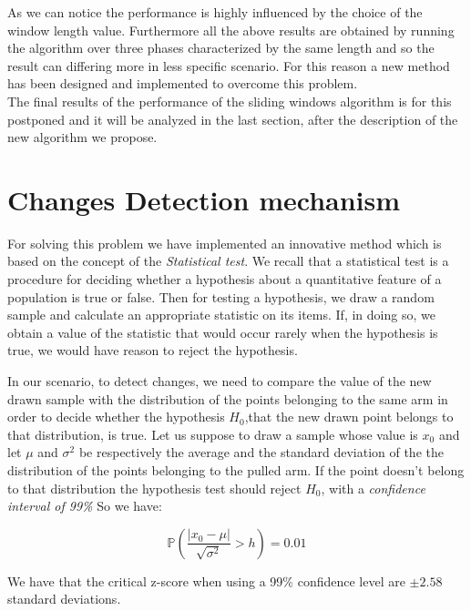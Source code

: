 As we can notice the performance is highly influenced by the choice of the window length value.
Furthermore all the above results are obtained by running the algorithm over three phases characterized by the same length and so the result can differing more in less specific scenario. For this reason a new method has been designed and implemented to overcome this problem.\\
The final results of the performance of the sliding windows algorithm is for this postponed and it will be analyzed in the last section, after the description of the new algorithm we propose.


\section{Changes Detection mechanism}

For solving this problem we have implemented an innovative method which is based on the concept of the \textit{Statistical test}.
We recall that a statistical test is a procedure for deciding whether a hypothesis about a quantitative feature of a population is true or false. Then for testing a hypothesis, we draw a random sample and calculate an appropriate statistic on its items. If, in doing so, we obtain a value of the statistic that would occur rarely when the hypothesis is true, we would have reason to reject the hypothesis.

In our scenario, to detect changes, we need to compare the value of the new drawn sample with the distribution of the points belonging to the same arm in order to decide whether the hypothesis $H_0$,that the new drawn point belongs to that distribution, is true.
Let us suppose to draw a sample whose value is $x_0$ and let $\mu$ and $\sigma^2$ be respectively the average
and the standard deviation of the the distribution of the points belonging to the pulled arm.
If the point doesn't belong to that distribution the hypothesis test should reject $H_0$, with a \textit{confidence interval of 99\%} So we have:

\begin{equation}
    \mathbb{P}\left(\frac{|x_0 - \mu|}{\sqrt{\sigma^2}} > h \right) = 0.01
\end{equation}

We have that the critical z-score when using a 99\% confidence level are $\pm 2.58$ standard deviations.\\

